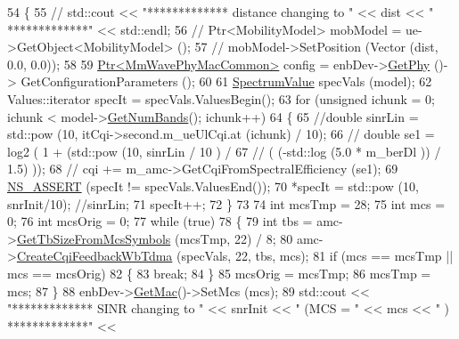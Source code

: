 \begin{DoxyCode}
54 \{
55 \textcolor{comment}{//  std::cout << "************* distance changing to " << dist << " *************" << std::endl;}
56 \textcolor{comment}{//  Ptr<MobilityModel> mobModel = ue->GetObject<MobilityModel> ();}
57 \textcolor{comment}{//  mobModel->SetPosition (Vector (dist, 0.0, 0.0));}
58 
59         \hyperlink{classns3_1_1Ptr}{Ptr<MmWavePhyMacCommon>} config = enbDev->\hyperlink{classns3_1_1MmWaveEnbNetDevice_a66bf394e8d7f7c853f4fc6b671f188ca}{GetPhy} ()->
      GetConfigurationParameters ();
60 
61         \hyperlink{classns3_1_1SpectrumValue}{SpectrumValue} specVals (model);
62         Values::iterator specIt = specVals.ValuesBegin();
63         \textcolor{keywordflow}{for} (\textcolor{keywordtype}{unsigned} ichunk = 0; ichunk < model->\hyperlink{classns3_1_1SpectrumModel_a07c4a1c2f963885dd7fef7f82b20e90b}{GetNumBands}(); ichunk++)
64         \{
65                 \textcolor{comment}{//double sinrLin = std::pow (10, itCqi->second.m\_ueUlCqi.at (ichunk) / 10);}
66                 \textcolor{comment}{//                                              double se1 = log2 ( 1 + (std::pow (10,
       sinrLin / 10 )  /}
67                 \textcolor{comment}{//                                                              ( (-std::log (5.0 * m\_berDl
       )) / 1.5) ));}
68                 \textcolor{comment}{//                                              cqi += m\_amc->GetCqiFromSpectralEfficiency
       (se1);}
69                 \hyperlink{assert_8h_a6dccdb0de9b252f60088ce281c49d052}{NS\_ASSERT} (specIt != specVals.ValuesEnd());
70                 *specIt = std::pow (10, snrInit/10); \textcolor{comment}{//sinrLin;}
71                 specIt++;
72         \}
73 
74   \textcolor{keywordtype}{int} mcsTmp = 28;
75   \textcolor{keywordtype}{int} mcs = 0;
76   \textcolor{keywordtype}{int} mcsOrig = 0;
77   \textcolor{keywordflow}{while} (\textcolor{keyword}{true})
78   \{
79         \textcolor{keywordtype}{int} tbs = amc->\hyperlink{classns3_1_1MmWaveAmc_a7e972b1d61df4f0236301ecb24f13447}{GetTbSizeFromMcsSymbols} (mcsTmp, 22) / 8;
80         amc->\hyperlink{classns3_1_1MmWaveAmc_a692293fdeba014cbaa8e316bd12a6fd0}{CreateCqiFeedbackWbTdma} (specVals, 22, tbs, mcs);
81         \textcolor{keywordflow}{if} (mcs == mcsTmp || mcs == mcsOrig)
82         \{
83                 \textcolor{keywordflow}{break};
84         \}
85         mcsOrig = mcsTmp;
86         mcsTmp = mcs;
87   \}
88   enbDev->\hyperlink{classns3_1_1MmWaveEnbNetDevice_aa32992373e5de4c6228a793b345b3479}{GetMac}()->SetMcs (mcs);
89   std::cout << \textcolor{stringliteral}{"************* SINR changing to "} << snrInit << \textcolor{stringliteral}{" (MCS = "} << mcs << \textcolor{stringliteral}{" ) *************"} << 

\end{DoxyCode}
